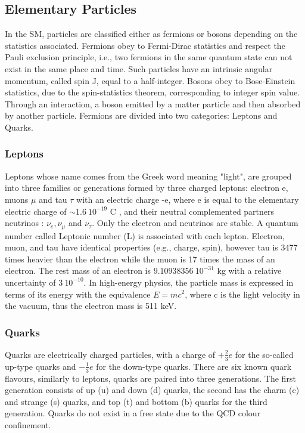 \subsection{Elementary Particles}
\label{chap1:SM:EP}
In the SM, particles are classified either as fermions or bosons depending on the statistics associated. Fermions obey to Fermi-Dirac statistics and respect the Pauli exclusion principle, i.e., two fermions in the same quantum state can not exist in the same place and time. Such particles have an intrinsic angular momentum, called spin J, equal to a half-integer. Bosons obey to Bose-Einstein statistics, due to the spin-statistics theorem, corresponding to integer spin value. Through an interaction, a boson emitted by a matter particle and then absorbed by another particle. Fermions are divided into two categories: Leptons and Quarks.

\subsubsection{Leptons}
Leptons whose name comes from the Greek word meaning "light", are grouped into three families or generations formed by three charged leptons: electron e, muons $\mu$ and tau $\tau$ with an electric charge -e, where e is equal to the elementary electric charge of $\sim 1.6 \ 10^{-19} $ C \cite{PDG}, and their neutral complemented partners neutrinos : $\nu_{e}, \nu_{\mu}$ and $\nu_{\tau}$. Only the electron and neutrinos are stable. A quantum number called Leptonic number (L) is associated with each lepton. Electron, muon, and tau have identical properties (e.g., charge, spin), however tau is 3477 times heavier than the electron while the muon is 17 times the mass of an electron. The rest mass of an electron is $9.10938356 \ 10^{-31} $ kg with a relative uncertainty of $3 \ 10^{-10}$. In high-energy physics, the particle mass is expressed in terms of its energy with the equivalence $E=mc^2$, where c is the light velocity in the vacuum, thus the electron mass is 511 keV.

\subsubsection{Quarks}
Quarks are electrically charged particles, with a charge of $+\frac{2}{3}e$ for the so-called up-type quarks and $-\frac{1}{3}e$ for the down-type quarks. There are six known quark flavours, similarly to leptons, quarks are paired into three generations. The first generation consists of up (u) and down (d) quarks, the second has the charm (c) and strange (s) quarks, and top (t) and bottom (b) quarks for the third generation. Quarks do not exist in a free state due to the QCD colour confinement. \\

